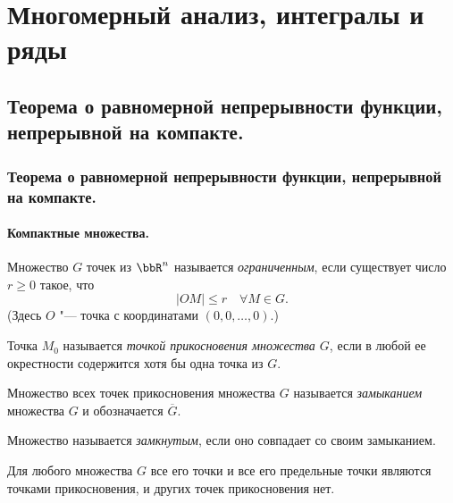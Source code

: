 \part[Многомерный анализ, интегралы и ряды]{Многомерный анализ, интегралы и ряды}%
\chapter[Теорема о равномерной непрерывности функции, непрерывной на компакте.]{Теорема о равномерной непрерывности функции, непрерывной на компакте.}

\section{Теорема о равномерной непрерывности функции, непрерывной на компакте.}

\subsection{Компактные множества.}

\begin{defn}
Множество $G$ точек из $\bbR ^n$ называется \textit{ограниченным}, если существует число $r\ge 0$ такое, что
$$
|OM|\le r \quad \forall M\in G.
$$
(Здесь $O$ "--- точка с координатами $(0, 0, \ldots , 0).$)
\end{defn}

\begin{defn}
Точка $M_0$ называется \textit{точкой прикосновения множества $G$}, если в любой ее окрестности содержится хотя бы одна точка из $G$.
\end{defn}

\begin{defn}
Множество всех точек прикосновения множества $G$ называется \textit{замыканием} множества $G$ и обозначается $\overline{G}$.
\end{defn}

\begin{defn}
Множество называется \textit{замкнутым}, если оно совпадает со своим замыканием.
\end{defn}

Для любого множества $G$ все его точки и все его предельные точки являются точками прикосновения, и других точек прикосновения нет.

